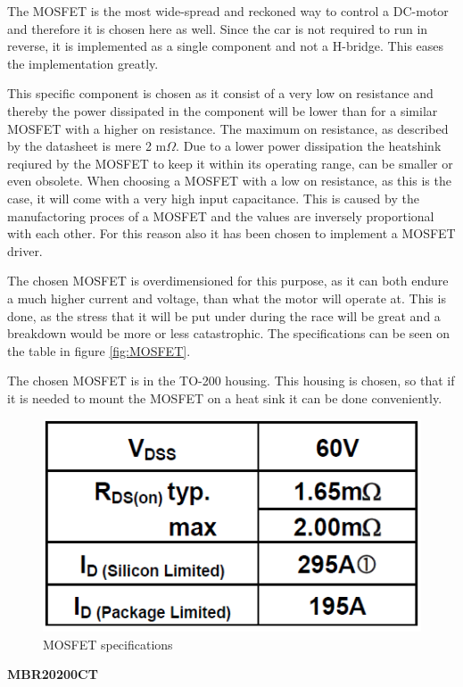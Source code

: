 The MOSFET is the most wide-spread and reckoned way to control a DC-motor and therefore it is chosen here as well. Since the car is not required to run in reverse, it is implemented as a single component and not a H-bridge. This eases the implementation greatly.

This specific component is chosen as it consist of a very low on resistance and thereby the power dissipated in the component will be lower than for a similar MOSFET with a higher on resistance. The maximum on resistance, as described by the datasheet is mere 2 m$\Omega$. Due to a lower power dissipation the heatshink reqiured by the MOSFET to keep it within its operating range, can be smaller or even obsolete. When choosing a MOSFET with a low on resistance, as this is the case, it will come with a very high input capacitance. This is caused by the manufactoring proces of a MOSFET and the values are inversely proportional with each other. For this reason also it has been chosen to implement a MOSFET driver. 

The chosen MOSFET is overdimensioned for this purpose, as it can both endure a much higher current and voltage, than what the motor will operate at. This is done, as the stress that it will be put under during the race will be great and a breakdown would be more or less catastrophic. The specifications can be seen on the table in figure \vref{fig:MOSFET}.

The chosen MOSFET is in the TO-200 housing. This housing is chosen, so that if it is needed to mount the MOSFET on a heat sink it can be done conveniently.  

\begin{figure}[H]
	\centering
	\includegraphics[width=0.85\linewidth]{Hardware/Pictures/MOSFET}
	\caption{MOSFET specifications}
	\label{fig:MOSFET}
\end{figure}

\textbf{MBR20200CT} \cite{MBR20200}


